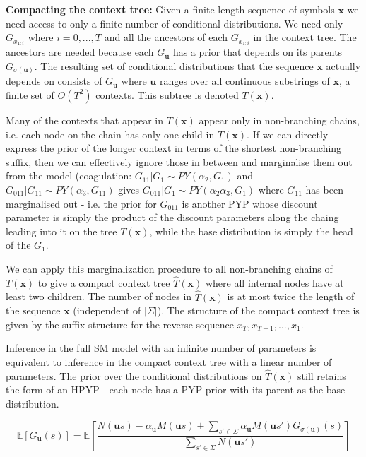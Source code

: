 \textbf{Compacting the context tree:} Given a finite length sequence of symbols $\textbf{x}$ we need access to only a finite number of conditional distributions. We need only $G_{x_{1:i}}$ where $i=0, ..., T$ and all the ancestors of each $G_{x_{1:i}}$ in the context tree. The ancestors are needed because each $G_{\textbf{u}}$ has a prior that depends on its parents $G_{\sigma(\textbf{u})}$. The resulting set of conditional distributions that the sequence $\textbf{x}$ actually depends on consists of $G_{\textbf{u}}$ where $\textbf{u}$ ranges over all continuous substrings of $\textbf{x}$, a finite set of $O(T^2)$ contexts. This subtree is denoted $T(\textbf{x})$.

Many of the contexts that appear in $T(\textbf{x})$ appear only in non-branching chains, i.e. each node on the chain has only one child in $T(\textbf{x})$. If we can directly express the prior of the longer context in terms of the shortest non-branching suffix, then we can effectively ignore those in between and marginalise them out from the model (coagulation: $G_{11}|G_{1}\sim PY(\alpha_{2}, G_{1})$ and $G_{011}|G_{11}\sim PY(\alpha_{3}, G_{11})$ gives $G_{011}|G_{1}\sim PY(\alpha_{2}\alpha_{3}, G_{1})$ where $G_{11}$ has been marginalised out - i.e. the prior for $G_{011}$ is another PYP whose discount parameter is simply the product of the discount parameters along the chaing leading into it on the tree $T(\textbf{x})$, while the base distribution is simply the head of the $G_{1}$.

We can apply this marginalization procedure to all non-branching chains of $T(\textbf{x})$ to give a compact context tree $\hat{T}(\textbf{x})$ where all internal nodes have at least two children. The number of nodes in $\hat{T}(\textbf{x})$ is at most twice the length of the sequence $\textbf{x}$ (independent of $|\Sigma|$). The structure of the compact context tree is given by the suffix structure for the reverse sequence $x_{T}, x_{T-1}, ..., x_{1}$.

Inference in the full SM model with an infinite number of parameters is equivalent to inference in the compact context tree with a linear number of parameters. The prior over the conditional distributions on $\hat{T}(\textbf{x})$ still retains the form of an HPYP - each node has a PYP prior with its parent as the base distribution.

\begin{equation}
\mathbb E [G_{\textbf{u}}(s)]=\mathbb E \left [ \frac{N(\textbf{u}s)-\alpha_{\textbf{u}}M(\textbf{u}s)+\sum_{s'\in \Sigma}\alpha_{\textbf{u}}M(\textbf{u}s')G_{\sigma(\textbf{u})}(s)}{\sum_{s'\in \Sigma}N(\textbf{u}s')}\right ]
\label{eq:seqMemCompact}
\end{equation}


